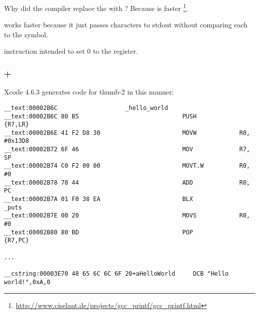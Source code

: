 {Why did the compiler replace the \printf with \puts? Because \puts is faster}
\footnote{\url{http://www.ciselant.de/projects/gcc_printf/gcc_printf.html}}. 

{\puts works faster because it just passes characters to stdout without comparing each to the \IT{\%} symbol.}

{instruction intended to set $0$ to the \Rzero register}.

\subsubsection{\OptimizingXcode + \ThumbTwoMode}

 Xcode 4.6.3 
{generates code for thumb-2 in this manner}:

\begin{lstlisting}[caption=\OptimizingXcode + \ThumbTwoMode]
__text:00002B6C                   _hello_world
__text:00002B6C 80 B5                             PUSH            {R7,LR}
__text:00002B6E 41 F2 D8 30                       MOVW            R0, #0x13D8
__text:00002B72 6F 46                             MOV             R7, SP
__text:00002B74 C0 F2 00 00                       MOVT.W          R0, #0
__text:00002B78 78 44                             ADD             R0, PC
__text:00002B7A 01 F0 38 EA                       BLX             _puts
__text:00002B7E 00 20                             MOVS            R0, #0
__text:00002B80 80 BD                             POP             {R7,PC}

...

__cstring:00003E70 48 65 6C 6C 6F 20+aHelloWorld     DCB "Hello world!",0xA,0
\end{lstlisting}

